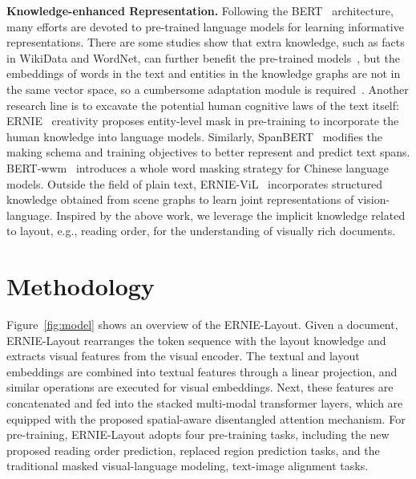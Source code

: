 \documentclass[11pt]{article}
\begin{document}
\noindent\textbf{Knowledge-enhanced Representation.}
Following the BERT~\cite{devlin2019bert} architecture, many efforts are devoted to pre-trained language models for learning informative representations. 
There are some studies show that extra knowledge, such as facts in WikiData and WordNet, can further benefit the pre-trained models~\cite{zhang2019ernie,liu2020kbert,he2020bert,wang2021kepler}, but the embeddings of words in the text and entities in the knowledge graphs are not in the same vector space, so a cumbersome adaptation module is required~\cite{he2020bert,wang2021kadapter}.
Another research line is to excavate the potential human cognitive laws of the text itself:
ERNIE~\cite{sun2019ernie} creativity proposes entity-level mask in pre-training to incorporate the human knowledge into language models.
Similarly, SpanBERT~\cite{joshi2020spanbert} modifies the making schema and training objectives to better represent and predict text spans.
BERT-wwm~\cite{cui2021pre} introduces a whole word masking strategy for Chinese language models.
Outside the field of plain text, ERNIE-ViL~\cite{yu2021ernie} incorporates structured knowledge obtained from scene graphs to learn joint representations of vision-language.
Inspired by the above work, we leverage the implicit knowledge related to layout, e.g., reading order, for the understanding of visually rich documents.

 
 
\section{Methodology}

Figure~\ref{fig:model} shows an overview of the ERNIE-Layout.
Given a document, ERNIE-Layout rearranges the token sequence with the layout knowledge and extracts visual features from the visual encoder.
The textual and layout embeddings are combined into textual features through a linear projection, and similar operations are executed for visual embeddings. 
Next, these features are concatenated and fed into the stacked multi-modal transformer layers, which are equipped with the proposed spatial-aware disentangled attention mechanism.
For pre-training, ERNIE-Layout adopts four pre-training tasks, including the new proposed reading order prediction, replaced region prediction tasks, and the traditional masked visual-language modeling, text-image alignment tasks.


\end{document}
